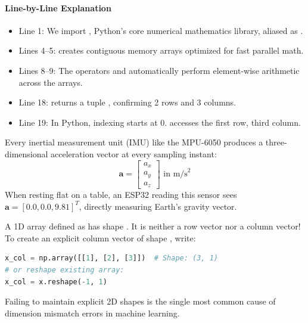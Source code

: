 \paragraph{Line-by-Line Explanation}
\begin{itemize}
    \item Line 1: We import , Python's core numerical mathematics library, aliased as .
    \item Lines 4--5:  creates contiguous memory arrays optimized for fast parallel math.
    \item Lines 8--9: The operators \code{+} and \code{*} automatically perform element-wise arithmetic across the arrays.
    \item Line 18:  returns a tuple , confirming 2 rows and 3 columns.
    \item Line 19: In Python, indexing starts at $0$.  accesses the first row, third column.
\end{itemize}

\begin{iotbox}
Every inertial measurement unit (IMU) like the MPU-6050 produces a three-dimensional acceleration vector at every sampling instant:
\begin{equation*}
\mathbf{a} = \begin{bmatrix} a_x \\ a_y \\ a_z \end{bmatrix} \text{ in } \text{m/s}^2
\end{equation*}
When resting flat on a table, an ESP32 reading this sensor sees $\mathbf{a} = [0.0, 0.0, 9.81]^T$, directly measuring Earth's gravity vector.
\end{iotbox}

\begin{warning}
A 1D array defined as  has shape . It is neither a row vector nor a column vector! 
To create an explicit column vector of shape , write:
\begin{lstlisting}[language=Python]
x_col = np.array([[1], [2], [3]])  # Shape: (3, 1)
# or reshape existing array:
x_col = x.reshape(-1, 1)
\end{lstlisting}
Failing to maintain explicit 2D shapes is the single most common cause of dimension mismatch errors in machine learning.
\end{warning}

